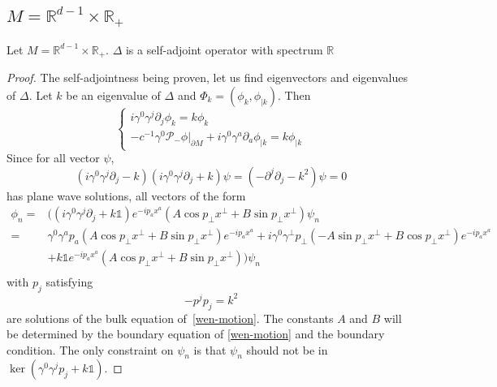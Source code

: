 \subsection{$M = \mathbb{R}^{d-1} \times \mathbb{R}_+$}\label{wen-subsect1}
\begin{proposition}
Let $M = \mathbb{R}^{d-1} \times \mathbb{R}_+$. $\Delta$ is a self-adjoint operator with spectrum $\mathbb{R}$
\end{proposition}
\begin{proof}
The self-adjointness being proven, let us find eigenvectors and eigenvalues of $\Delta$. 
Let $k$ be an eigenvalue of $\Delta$ and $\Phi_k = (\phi_k, \phi_{| k})$. Then
\begin{equation}\label{wen-motion2}
\begin{cases}
i \gamma^0 \gamma^j \partial_j \phi_k = k \phi_k \\
-c^{-1} \gamma^0 \mathcal{P}_- \phi\vert_{\partial M} + i \gamma^0 \gamma^a \partial_a \phi_{| k} = k \phi_{| k}
\end{cases}
\end{equation}
Since for all vector $\psi$,
\begin{equation*}
(i\gamma^0 \gamma^j\partial_j - k )(i\gamma^0 \gamma^j\partial_j + k )\psi = 
(- \partial^j\partial_j - k^2) \psi = 0
\end{equation*}
has plane wave solutions, 
all vectors of the form
\begin{equation*}
\begin{split}
\phi_n = & \Big((i\gamma^0\gamma^j\partial_j + k \mathbb{1}) e^{-ip_a x^a }(A\cos p_\bot x^\bot + B \sin p_\bot x^\bot) \psi_n \\
 = &\gamma^0\gamma^a p_a (A \cos p_\bot x^\bot + B \sin p_\bot x^\bot)e^{-ip_a x^a}
+ i\gamma^0\gamma^\bot p_\bot (-A \sin p_\bot x^\bot + B \cos p_\bot x^\bot) e^{-ip_a x^a} \\
& + k \mathbb{1} e^{-ip_a x^a}(A\cos p_\bot x^\bot + B \sin p_\bot x^\bot)\Big)\psi_n  \\
\end{split}
\end{equation*}
with $p_j$ satisfying
\begin{equation*}
- p^j p_j = k^2
\end{equation*}
are solutions of the bulk equation of~\cref{wen-motion}. 
The constants $A$ and $B$ will be determined by the boundary equation of \cref{wen-motion} and the boundary condition. 
The only constraint on $\psi_n$ is that $\psi_n$ should not be in $\ker( \gamma^0 \gamma^j p_j + k \mathbb{1})$. 

\end{proof}
